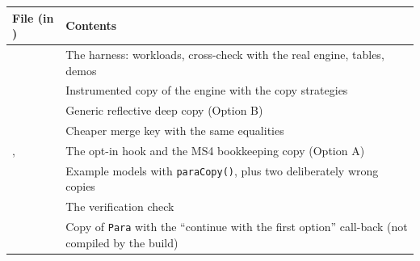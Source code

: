 \documentclass[11pt]{article}
\newcommand{\code}[1]{\texttt{#1}}
\begin{document}
\begin{center}\small
\begin{tabularx}{\linewidth}{@{}>{\raggedright}p{5.6cm}Y@{}}
\toprule
\textbf{File (in )} & \textbf{Contents}\\
\midrule
{} & The harness: workloads, cross-check with the real engine, tables, demos\\
 & Instrumented copy of the engine with the copy strategies\\
 & Generic reflective deep copy (Option B)\\
 & Cheaper merge key with the same equalities\\
,  & The opt-in hook and the MS4 bookkeeping
  copy (Option A)\\
 & Example models with \code{paraCopy()}, plus two deliberately wrong
  copies\\
 & The verification check\\
 & Copy of \code{Para} with the ``continue with the first option'' call-back (not
  compiled by the build)\\
\bottomrule
\end{tabularx}
\end{center}

\end{document}
